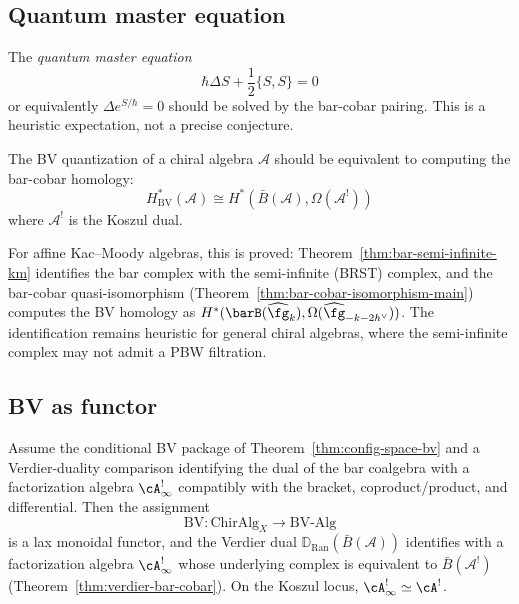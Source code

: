 \subsection{Quantum master equation}

\begin{remark}
\label{rem:quantum-master-complete}%
The \emph{quantum master equation}
\[\hbar \Delta S + \frac{1}{2}\{S, S\} = 0\]
or equivalently $\Delta e^{S/\hbar} = 0$
should be solved by the bar-cobar pairing. This is a heuristic
expectation, not a precise conjecture.
\end{remark}

\begin{remark}
\label{rem:bv-equals-bar-cobar}%
The BV quantization of a chiral algebra $\mathcal{A}$ should be
equivalent to computing the bar-cobar homology:
\[H^*_{\text{BV}}(\mathcal{A}) \cong H^*(\bar{B}(\mathcal{A}), \Omega(\mathcal{A}^!))\]
where $\mathcal{A}^!$ is the Koszul dual.

For affine Kac--Moody algebras, this is proved:
Theorem~\ref{thm:bar-semi-infinite-km} identifies the bar complex
with the semi-infinite \textup{(}BRST\textup{)} complex, and the
bar-cobar quasi-isomorphism
\textup{(}Theorem~\ref{thm:bar-cobar-isomorphism-main}\textup{)}
computes the BV homology as $H^*(\barB(\widehat{\fg}_k),
\Omega(\widehat{\fg}_{-k-2h^\vee}))$.
The identification remains heuristic for general chiral algebras,
where the semi-infinite complex may not admit a PBW filtration.
\end{remark}

\subsection{BV as functor}

\begin{theorem}
\label{thm:bv-functor}
Assume the conditional BV package of
Theorem~\ref{thm:config-space-bv} and a Verdier-duality comparison
identifying the dual of the bar coalgebra with a factorization algebra
$\cA^!_\infty$ compatibly with the bracket, coproduct/product, and
differential. Then the assignment
\[\mathrm{BV}: \mathrm{ChirAlg}_X \longrightarrow \mathrm{BV\text{-}Alg}\]
is a lax monoidal functor, and the Verdier dual
$\mathbb{D}_{\operatorname{Ran}}(\bar{B}(\mathcal{A}))$ identifies
with a factorization algebra $\cA^!_\infty$ whose underlying complex
is equivalent to $\bar{B}(\mathcal{A}^!)$
\textup{(}Theorem~\textup{\ref{thm:verdier-bar-cobar}}\textup{)}.
On the Koszul locus, $\cA^!_\infty \simeq \cA^!$.
\end{theorem}

